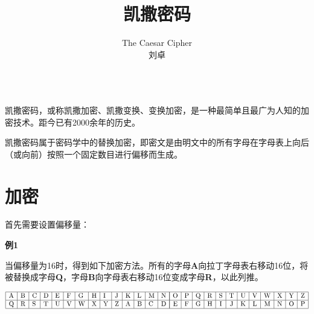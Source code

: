 \documentclass{article}
\date{}
\title{凯撒密码}
\author{
The Caesar Cipher\\
 刘卓\\
 \texttt{ } \\
}
\begin{document}
\maketitle

凯撒密码，或称凯撒加密、凯撒变换、变换加密，是一种最简单且最广为人知的加密技术。距今已有2000余年的历史。

凯撒密码属于密码学中的替换加密，即密文是由明文中的所有字母在字母表上向后（或向前）按照一个固定数目进行偏移而生成。


\section{加密}

首先需要设置偏移量：

\textbf{例1}

当偏移量为16时，得到如下加密方法。所有的字母\textbf{A}向拉丁字母表右移动16位，将被替换成字母\textbf{Q}，字母\textbf{B}向字母表右移动16位变成字母\textbf{R}，以此列推。

$$
\begin{array}{|l|l|l|l|l|l|l|l|l|l|l|l|l|l|}
\hline \mathrm{A} & \mathrm{B} & \mathrm{C} & \mathrm{D} & \mathrm{E} & \mathrm{F} & \mathrm{G} & \mathrm{H} & \mathrm{I} & \mathrm{J} & \mathrm{K} & \mathrm{L} & \mathrm{M} & \mathrm{N} \\
\hline \mathrm{Q} & \mathrm{R} & \mathrm{S} & \mathrm{T} & \mathrm{U} & \mathrm{V} & \mathrm{W} & \mathrm{X} & \mathrm{Y} & \mathrm{Z} & \mathrm{A} & \mathrm{B} & \mathrm{C} & \mathrm{D} \\
\hline
\end{array}\\
\begin{array}{|c|c|c|c|c|c|c|c|c|c|c|c|}
\hline \mathrm{O} & \mathrm{P} & \mathrm{Q} & \mathrm{R} & \mathrm{S} & \mathrm{T} & \mathrm{U} & \mathrm{V} & \mathrm{W} & \mathrm{X} & \mathrm{Y} & \mathrm{Z} \\
\hline \mathrm{E} & \mathrm{F} & \mathrm{G} & \mathrm{H} & \mathrm{I} & \mathrm{J} & \mathrm{K} & \mathrm{L} & \mathrm{M} & \mathrm{N} & \mathrm{O} & \mathrm{P} \\
\hline
\end{array}
$$
\end{document}
